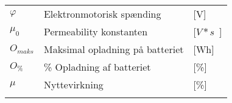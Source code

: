 \begin{table}[H]
\begin{tabular}{lll}
$ \varphi$                     & Elektronmotorisk spænding      &   [\si{V}]           \\
$ \mu_0 $                     & Permeability konstanten          & [\si{$V*s$}]             \\
$ O_{maks} $                  & Maksimal opladning på batteriet  & [\si{Wh}]              \\
$ O_{\%} $                     & \% Opladning af batteriet        & [\%]                 \\
$ \mu $                       & Nyttevirkning                    & [\%]                 \\
                            &                                  &                   
\end{tabular}
\end{table}
\newpage